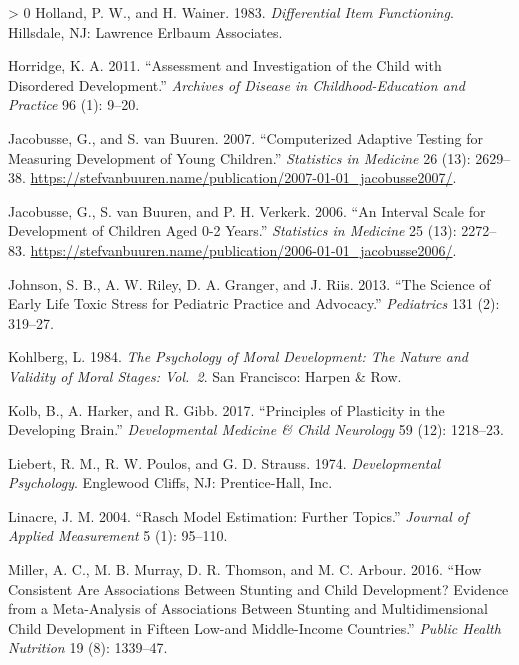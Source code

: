 \documentclass[
]{book}
\newlength{\cslhangindent}
\newenvironment{CSLReferences}[3] %
 {%
  \setlength{\parindent}{0pt}
  \ifodd #1 \everypar{\setlength{\hangindent}{\cslhangindent}}\ignorespaces\fi
  \ifnum #2 > 0
  \setlength{\parskip}{#2\baselineskip}
  \fi
 }%
 {}
\begin{document}
\begin{CSLReferences}{1}{0}
\leavevmode\hypertarget{ref-holland1983}{}%
Holland, P. W., and H. Wainer. 1983. \emph{Differential Item Functioning}. Hillsdale, NJ: Lawrence Erlbaum Associates.

\leavevmode\hypertarget{ref-horridge2011}{}%
Horridge, K. A. 2011. {``Assessment and Investigation of the Child with Disordered Development.''} \emph{Archives of Disease in Childhood-Education and Practice} 96 (1): 9--20.

\leavevmode\hypertarget{ref-jacobusse2007}{}%
Jacobusse, G., and S. van Buuren. 2007. {``Computerized Adaptive Testing for Measuring Development of Young Children.''} \emph{Statistics in Medicine} 26 (13): 2629--38. \url{https://stefvanbuuren.name/publication/2007-01-01_jacobusse2007/}.

\leavevmode\hypertarget{ref-jacobusse2006}{}%
Jacobusse, G., S. van Buuren, and P. H. Verkerk. 2006. {``An Interval Scale for Development of Children Aged 0-2 Years.''} \emph{Statistics in Medicine} 25 (13): 2272--83. \url{https://stefvanbuuren.name/publication/2006-01-01_jacobusse2006/}.

\leavevmode\hypertarget{ref-johnson2013science}{}%
Johnson, S. B., A. W. Riley, D. A. Granger, and J. Riis. 2013. {``The Science of Early Life Toxic Stress for Pediatric Practice and Advocacy.''} \emph{Pediatrics} 131 (2): 319--27.

\leavevmode\hypertarget{ref-kohlberg1984}{}%
Kohlberg, L. 1984. \emph{The Psychology of Moral Development: The Nature and Validity of Moral Stages: Vol.~2}. San Francisco: Harpen \& Row.

\leavevmode\hypertarget{ref-kolb2017principles}{}%
Kolb, B., A. Harker, and R. Gibb. 2017. {``Principles of Plasticity in the Developing Brain.''} \emph{Developmental Medicine \& Child Neurology} 59 (12): 1218--23.

\leavevmode\hypertarget{ref-liebert1974}{}%
Liebert, R. M., R. W. Poulos, and G. D. Strauss. 1974. \emph{Developmental Psychology}. Englewood Cliffs, NJ: Prentice-Hall, Inc.

\leavevmode\hypertarget{ref-linacre2004}{}%
Linacre, J. M. 2004. {``Rasch Model Estimation: Further Topics.''} \emph{Journal of Applied Measurement} 5 (1): 95--110.

\leavevmode\hypertarget{ref-miller2016consistent}{}%
Miller, A. C., M. B. Murray, D. R. Thomson, and M. C. Arbour. 2016. {``How Consistent Are Associations Between Stunting and Child Development? Evidence from a Meta-Analysis of Associations Between Stunting and Multidimensional Child Development in Fifteen Low-and Middle-Income Countries.''} \emph{Public Health Nutrition} 19 (8): 1339--47.


\end{CSLReferences}
\end{document}
